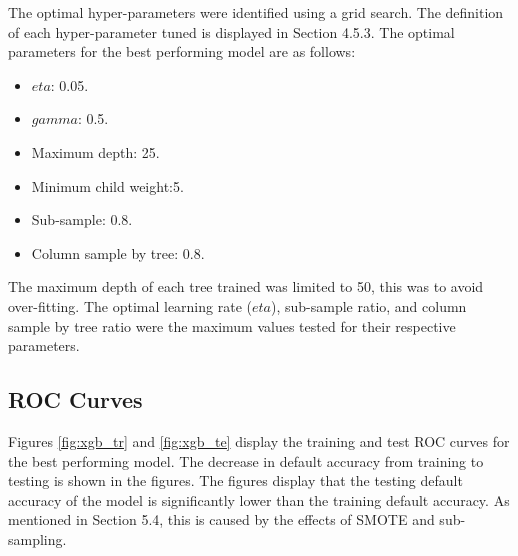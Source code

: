 The optimal hyper-parameters were identified using a grid search. The definition of each hyper-parameter tuned is displayed in Section 4.5.3. The optimal parameters for the best performing model are as follows: 

\begin{itemize}
    \item $eta$: 0.05.  
    \item $gamma$: 0.5. 
    \item Maximum depth: 25. 
    \item Minimum child weight:5. 
    \item Sub-sample: 0.8. 
    \item Column sample by tree: 0.8. 
\end{itemize}

The maximum depth of each tree trained was limited to 50, this was to avoid over-fitting. The optimal learning rate ($eta$), sub-sample ratio, and column sample by tree ratio were the maximum values tested for their respective parameters. 

\subsection{ROC Curves}

Figures \ref{fig:xgb_tr} and \ref{fig:xgb_te} display the training and test ROC curves for the best performing model. The decrease in default accuracy from training to testing is shown in the figures. The figures display that the testing default accuracy of the model is significantly lower than the training default accuracy. As mentioned in Section 5.4, this is caused by the effects of SMOTE and sub-sampling.  

\vspace{10 pt}

